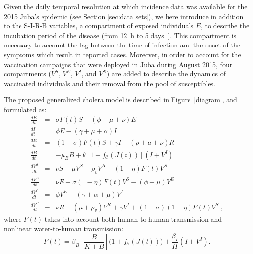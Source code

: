 Given the daily temporal resolution at which incidence data was available for the 2015 Juba's epidemic (see Section \ref{sec:data sets}), we here introduce in addition to the S-I-R-B variables, a compartment of exposed individuals $E$, to describe the incubation period of the disease (from 12~h to 5 days~\cite{azman13}). This compartment is necessary to account the lag between the time of infection and the onset of the symptoms which result in reported cases. Moreover, in order to account for the vaccination campaigns that were deployed in Juba during August 2015, four compartments ($V^S$, $V^E$, $V^I$, and $V^R$) are added to describe the dynamics of vaccinated individuals and their removal from the pool of susceptibles.

The proposed generalized cholera model is described in Figure~\ref{diagram}, and formulated as:
\begin{eqnarray} \label{eq:fullmodel}
 \frac{dE}{dt} &=& \sigma F(t) S - (\phi + \mu +\nu) E \label{eq:E2}\\
 \frac{dI}{dt} &=& \phi E - (\gamma + \mu + \alpha) I \label{eq:I2}\\
 \frac{dR}{dt} &=& (1-\sigma) F(t) S + \gamma I - (\rho + \mu+\nu) R \label{eq:R2}\\
 \frac{dB}{dt} &=& - \mu_B B +\theta\left[1 + f_{\mathcal{C}}\left( J(t)\right) \right] (I+V^I) \label{eq:B2}\\
\frac{dV^S}{dt} &=& \nu S - \mu V^S+ \rho_{v} V^R - (1-\eta) F(t) V^S \label{eq:VS2}\\
 \frac{dV^E}{dt} &=& \nu E + \sigma (1-\eta) F(t) V^S-(\phi + \mu) V^E \label{eq:VE2}\\
 \frac{dV^I}{dt} &=&  \phi V^E -(\gamma + \alpha + \mu) V^I \label{eq:VI2}\\
 \frac{dV^R}{dt} &=& \nu R -(\mu +\rho_{v})V^R +\gamma V^I +(1-\sigma) (1-\eta) F(t) V^S\label{eq:VR2}\; ,
\end{eqnarray}
where $F(t)$ takes into account both human-to-human transmission and nonlinear water-to-human transmission:
\begin{equation}
  F(t) = \beta_B \left[\frac{B}{K + B} \right] \bigg(1+f_{\mathcal{E}}\left(J(t)\right)\bigg) + \frac{\beta_{I}}{H} (I+V^I).
\label{eq:force2}
\end{equation}

